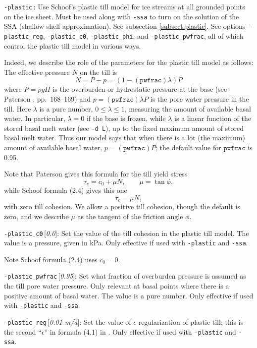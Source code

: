 \documentclass[11pt,final]{amsart}
\newcommand{\eps}{\epsilon}
\newcommand{\rawopt}[1]{\vspace{1mm}\noindent \large\texttt{-#1}\normalsize}
\newcommand{\opt}[1]{\rawopt{#1}\,:\quad}
\newcommand{\optdef}[2]{\rawopt{#1}\,[\textsl{#2}]:\quad}
\newcommand{\und}{$\underline{\,\,\,}$}
\begin{document}
\opt{plastic}  Use Schoof's plastic till model for ice streams at all grounded points on the ice sheet.  Must be used along with \verb|-ssa| to turn on the solution of the SSA (shallow shelf approximation).  See subsection \ref{subsect:plastic}.  See options \verb|-plastic_reg|, \verb|-plastic_c0|, \verb|-plastic_phi|, and \verb|-plastic_pwfrac|, all of which control the plastic till model in various ways.

Indeed, we describe the role of the parameters for the plastic till model as follows: The effective pressure $N$ on the till is
	$$N = P - p = (1 - (\mathtt{pwfrac}) \lambda) P$$
where $P = \rho g H$ is the overburden or hydrostatic pressure at the base (see Paterson \cite{Paterson}, pp.~168--169) and $p = (\mathtt{pwfrac}) \lambda P$ is the pore water pressure in the till.  Here $\lambda$ is a pure number, $0\le \lambda \le 1$, measuring the amount of available basal water.  In particular, $\lambda = 0$ if the base is frozen, while $\lambda$ is a linear function of the stored basal melt water (see \verb|-d L|), up to the fixed maximum amount of stored basal melt water.  Thus our model says that when there is a lot (the maximum) amount of available basal water, $p= (\mathtt{pwfrac}) P$; the default value for $\mathtt{pwfrac}$ is 0.95.

Note that Paterson gives this formula for the till yield stress
	$$\tau_c = c_0 + \mu N, \qquad \mu = \tan \phi,$$
while Schoof \cite{SchoofStream} formula (2.4) gives this one
	$$\tau_c = \mu N,$$
with zero till cohesion.  We allow a positive till cohesion, though the default is zero, and we describe $\mu$ as the tangent of the friction angle $\phi$.

\optdef{plastic\und c0}{0.0}  Set the value of the till cohesion in the plastic till model.  The value is a pressure, given in kPa.  Only effective if used with \verb|-plastic| and \verb|-ssa|.

Note Schoof \cite{SchoofStream} formula (2.4) uses $c_0 = 0$.

\optdef{plastic\und pwfrac}{0.95}  Set what fraction of overburden pressure is assumed as the till pore water pressure.  Only relevant at basal points where there is a positive amount of basal water.  The value is a pure number.  Only effective if used with \verb|-plastic| and \verb|-ssa|.

\optdef{plastic\und reg}{0.01 m/a}    Set the value of $\eps$ regularization of plastic till; this is the second ``$\eps$'' in formula (4.1) in \cite{SchoofStream}.  Only effective if used with \verb|-plastic| and \verb|-ssa|.
\end{document}
